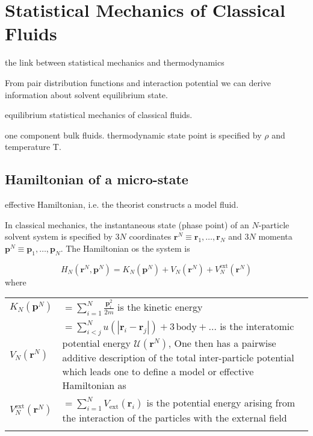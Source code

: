 
\chapter{Statistical Mechanics of Classical Fluids \label{chpt:statistical-mechanics}}

the link between statistical mechanics and thermodynamics

From pair distribution functions and interaction potential we can
derive information about solvent equilibrium state.

equilibrium statistical mechanics of classical fluids.

one component bulk fluids. thermodynamic state point is specified
by $\rho$ and temperature T. 


\section{Hamiltonian of a micro-state}

effective Hamiltonian, i.e. the theorist constructs a model fluid. 

In classical mechanics, the instantaneous state (phase point) of an
$N$-particle solvent system is specified by $3N$ coordinates $\mathbf{r}^{N}\equiv\mathbf{r}_{1},\ldots,\mathbf{r}_{N}$
and $3N$ momenta $\mathbf{p}^{N}\equiv\mathbf{p}_{1},\ldots,\mathbf{p}_{N}$.
The Hamiltonian os the system is

\begin{equation}
H_{N}(\mathbf{r}^{N},\mathbf{p}^{N})=K_{N}(\mathbf{p}^{N})+V_{N}(\mathbf{r}^{N})+V_{N}^{\mathrm{ext}}(\mathbf{r}^{N})
\end{equation}
where

\begin{tabular}{ll}
$K_{N}(\mathbf{p}^{N})$ & $={\displaystyle \sum_{i=1}^{N}\frac{\mathbf{p}_{i}^{2}}{2m}}$ is
the kinetic energy \tabularnewline
$V_{N}(\mathbf{r}^{N})$ & $={\displaystyle \sum_{i<j}^{N}u(\left|\mathbf{r}_{i}-\mathbf{r}_{j}\right|)+3\,\mathrm{body}+\ldots}$
is the interatomic potential energy $\mathcal{U}(\mathbf{r}^{N})$,
One then has a pairwise additive description of the total inter-particle
potential which leads one to define a model or effective Hamiltonian
as\tabularnewline
$V_{N}^{\mathrm{ext}}(\mathbf{r}^{N})$ & $={\displaystyle \sum_{i=1}^{N}}V_{\mathrm{ext}}(\mathbf{r}_{i})$
is the potential energy arising from the interaction of the particles
with the external field\tabularnewline
 & \tabularnewline
\end{tabular}

